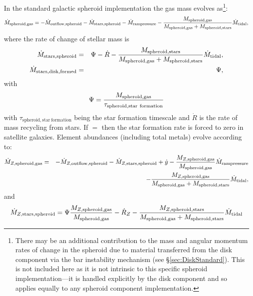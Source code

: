 In the standard galactic spheroid implementation the gas mass evolves as\footnote{There may be an additional contribution to the mass and angular momentum rates of change in the spheroid due to material transferred from the disk \gls{component} via the bar instability mechanism (see \S\protect\ref{sec:DiskStandard}). This is not included here as it is not intrinsic to this specific spheroid implementation---it is handled explicitly by the disk \gls{component} and so applies equally to any spheroid \gls{component} implementation.}:
\begin{equation}
 \dot{M}_\mathrm{spheroid, gas} = - \dot{M}_\mathrm{outflow, spheroid} - \dot{M}_\mathrm{stars, spheroid} - \dot{M}_\mathrm{ram pressure} - {M_\mathrm{spheroid, gas} \over M_\mathrm{spheroid, gas} + M_\mathrm{spheroid, stars}} \dot{M}_\mathrm{tidal},
\end{equation}
where the rate of change of stellar mass is
\begin{eqnarray}
 \dot{M}_\mathrm{stars, spheroid} &=& \Psi - \dot{R} - {M_\mathrm{spheroid, stars} \over M_\mathrm{spheroid, gas} + M_\mathrm{spheroid, stars}} \dot{M}_\mathrm{tidal}, \\
 \dot{M}_\mathrm{stars, disk, formed } &=& \Psi,
\end{eqnarray}
with
\begin{equation}
 \Psi = {M_\mathrm{spheroid, gas} \over \tau_\mathrm{spheroid, star~formation}}
\end{equation}
with $\tau_\mathrm{spheroid, star~formation}$ being the star formation timescale and $\dot{R}$ is the rate of mass recycling from stars. If \mono{[spheroidStarFormationInSatellites]}$=$ then the star formation rate is forced to zero in satellite galaxies. Element abundances (including total metals) evolve according to:
\begin{eqnarray}
  \dot{M}_{Z, \mathrm{spheroid, gas}} &=& - \dot{M}_{Z, \mathrm{outflow, spheroid}} - \dot{M}_{Z, \mathrm{stars, spheroid}} + \dot{y} - {M_{Z, \mathrm{spheroid, gas}} \over M_\mathrm{spheroid, gas}} \dot{M}_\mathrm{ram pressure} \nonumber \\ 
 & & - {M_{Z, \mathrm{spheroid, gas}} \over M_\mathrm{spheroid, gas} + M_\mathrm{spheroid, stars}} \dot{M}_\mathrm{tidal},
\end{eqnarray}
and
\begin{equation}
 \dot{M}_{Z, \mathrm{stars, spheroid}} = \Psi {M_{Z, \mathrm{spheroid, gas}} \over M_\mathrm{spheroid, gas}} - \dot{R}_Z - {M_{Z, \mathrm{spheroid, stars}} \over M_\mathrm{spheroid, gas} + M_\mathrm{spheroid, stars}} \dot{M}_\mathrm{tidal}
\end{equation}
